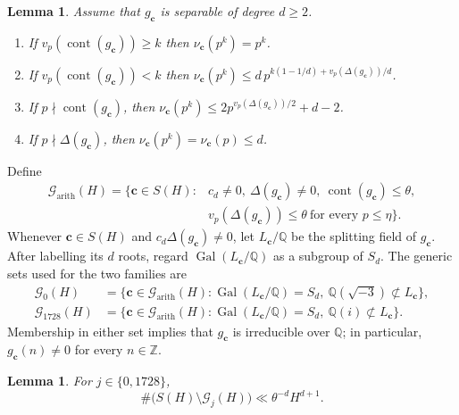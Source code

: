 \documentclass[12pt,reqno]{amsart}
\numberwithin{equation}{section}
\newtheorem{lemma}[theorem]{Lemma}
\theoremstyle{definition}
\renewcommand{\le}{\leqslant}
\renewcommand{\ge}{\geqslant}
\newcommand{\ZZ}{\mathbb{Z}}
\newcommand{\QQ}{\mathbb{Q}}
\newcommand{\cc}{\mathbf{c}}
\DeclareMathOperator{\Gal}{Gal}
\DeclareMathOperator{\cont}{cont}
\begin{document}
\begin{lemma}\label{lem:nu-bounds}
Assume that $g_\cc$ is separable of degree $d\ge 2$.
\begin{enumerate}
\item If $v_p(\cont(g_\cc))\ge k$ then $\nu_\cc(p^k)=p^k$.
\item If $v_p(\cont(g_\cc))<k$ then $\nu_\cc(p^k)\le d\,p^{k(1-1/d)+v_p(\Delta(g_\cc))/d}$.
\item If $p\nmid \cont(g_\cc)$, then $\nu_\cc(p^k)\le 2p^{v_p(\Delta(g_\cc))/2}+d-2$.
\item If $p\nmid \Delta(g_\cc)$, then $\nu_\cc(p^k)=\nu_\cc(p)\le d$.
\end{enumerate}
\end{lemma}

Define
\begin{equation}\label{eq:def-generic-arith}
\begin{aligned}
\mathcal G_{\mathrm{arith}}(H)=\bigl\{\cc\in S(H):{}&c_d\ne0,
\ \Delta(g_\cc)\ne0,\ \cont(g_\cc)\le\theta,\\
&v_p(\Delta(g_\cc))\le\theta\ \text{for every }p\le\eta\bigr\}.
\end{aligned}
\end{equation}
Whenever $\cc\in S(H)$ and $c_d\Delta(g_\cc)\ne0$, let $L_\cc/\QQ$ be the splitting field of $g_\cc$.
After labelling its $d$ roots, regard $\Gal(L_\cc/\QQ)$ as a subgroup of $S_d$.
The generic sets used for the two families are
\begin{equation}\label{eq:def-Gfamilies}
\begin{aligned}
\mathcal G_0(H)
&=\bigl\{\cc\in\mathcal G_{\mathrm{arith}}(H):
  \Gal(L_\cc/\QQ)=S_d,\ \QQ(\sqrt{-3})\not\subset L_\cc\bigr\},\\
\mathcal G_{1728}(H)
&=\bigl\{\cc\in\mathcal G_{\mathrm{arith}}(H):
  \Gal(L_\cc/\QQ)=S_d,\ \QQ(i)\not\subset L_\cc\bigr\}.
\end{aligned}
\end{equation}
Membership in either set implies that $g_\cc$ is irreducible over $\QQ$; in particular, $g_\cc(n)\ne0$ for every $n\in\ZZ$.

\begin{lemma}\label{lem:generic-families}
For $j\in\{0,1728\}$,
\[
\#\bigl(S(H)\setminus\mathcal G_j(H)\bigr)
\ll\theta^{-d}H^{d+1}.
\]
\end{lemma}
\end{document}
